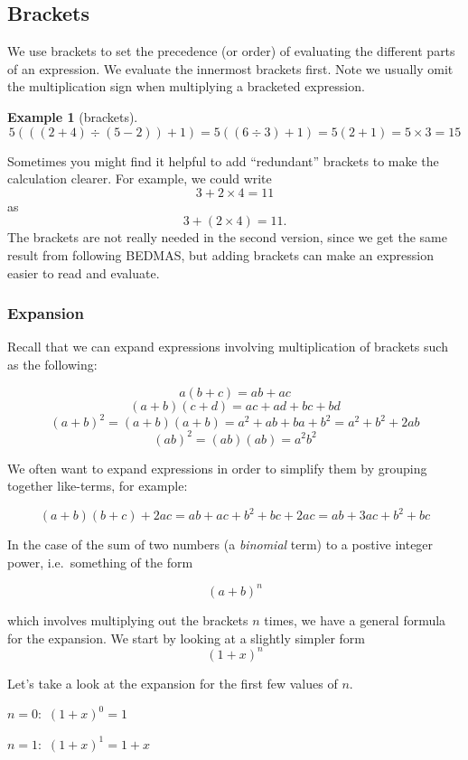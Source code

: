 \documentclass[
]{book}
\theoremstyle{definition}
\theoremstyle{definition}
\newtheorem{example}{Example}[chapter]
\theoremstyle{definition}
\theoremstyle{definition}
\theoremstyle{remark}
\begin{document}
\hypertarget{brackets}{%
\subsection{Brackets}\label{brackets}}

We use brackets to set the precedence (or order) of evaluating the different parts of an expression. We evaluate the innermost brackets first. Note we usually omit the multiplication sign when multiplying a bracketed expression.

\begin{example}[brackets]
\[5(((2+4)\div (5-2))+1)=5((6\div 3)+1)=5(2+1)=5\times 3 = 15\]
\end{example}

Sometimes you might find it helpful to add ``redundant'' brackets to make the calculation clearer. For example, we could write
\[3+2\times 4=11\]
as
\[3+(2\times 4)=11.\]
The brackets are not really needed in the second version, since we get the same result from following BEDMAS, but adding brackets can make an expression easier to read and evaluate.

\hypertarget{expansion}{%
\subsubsection{Expansion}\label{expansion}}

Recall that we can expand expressions involving multiplication of brackets such as the following:

\[a(b+c)=ab+ac\]
\[(a+b)(c+d)=ac+ad+bc+bd\]
\[(a+b)^2=(a+b)(a+b)=a^2+ab+ba+b^2=a^2+b^2+2ab\]
\[(ab)^2=(ab)(ab)=a^2b^2\]

We often want to expand expressions in order to simplify them by grouping together like-terms, for example:

\[(a+b)(b+c)+2ac=ab+ac+b^2+bc+2ac=ab+3ac+b^2+bc\]

In the case of the sum of two numbers (a \emph{binomial} term) to a postive integer power, i.e.~something of the form

\[(a+b)^n\]

which involves multiplying out the brackets \(n\) times, we have a general formula for the expansion. We start by looking at a slightly simpler form
\[(1+x)^n\]

Let's take a look at the expansion for the first few values of \(n\).

\(n=0:\) \((1+x)^0 = 1\)

\(n=1:\) \((1+x)^1=1+x\)
\end{document}
